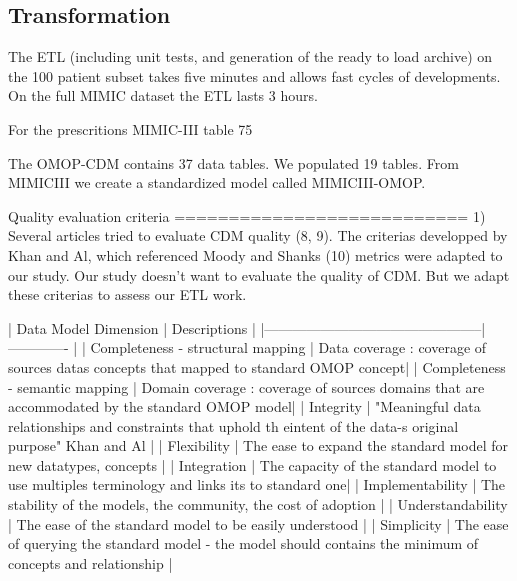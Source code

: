 \subsection{Transformation}
The ETL (including unit tests, and generation of the ready to load archive) on
the 100 patient subset takes five minutes and allows fast cycles of
developments. On the full MIMIC dataset the ETL lasts 3 hours. 



  For the prescritions MIMIC-III table 75%

The OMOP-CDM contains 37 data tables. We populated 19 tables.
From MIMICIII we create a standardized model called MIMICIII-OMOP.

Quality evaluation criteria
===========================
1)
Several articles tried to evaluate CDM quality (8, 9).
The criterias developped by Khan and Al, which referenced Moody and Shanks (10) metrics were adapted to our study.
Our study doesn't want to evaluate the quality of CDM. But we adapt these criterias to assess our ETL work.

| Data Model Dimension                          | Descriptions  |
|-----------------------------------------------|------------- |
| Completeness - structural mapping             | Data coverage : coverage of sources datas concepts that mapped to standard OMOP concept|
| Completeness - semantic mapping               | Domain coverage : coverage of sources domains that are accommodated by the standard OMOP model|
| Integrity                                     | "Meaningful data relationships and constraints that uphold th eintent of the data-s original purpose" Khan and Al |
| Flexibility                                   | The ease to expand the standard model for new datatypes, concepts |
| Integration                                   | The capacity of the standard model to use multiples terminology and links its to standard one|
| Implementability                              | The stability of the models, the community, the cost of adoption |
| Understandability                             | The ease of the standard model to be easily understood |
| Simplicity                                    | The ease of querying the standard model - the model should contains the minimum of concepts and relationship |

